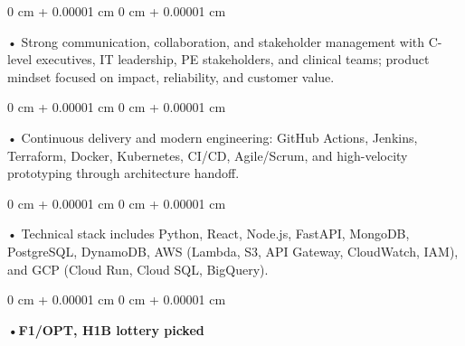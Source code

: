 \documentclass[10pt, letterpaper]{article}
\newenvironment{onecolentry}{
    \begin{adjustwidth}{
        0 cm + 0.00001 cm
    }{
        0 cm + 0.00001 cm
    }
}{
    \end{adjustwidth}
} %
\begin{document}
        \begin{onecolentry}
            • Strong communication, collaboration, and stakeholder management with C-level executives, IT leadership, PE stakeholders, and clinical teams; product mindset focused on impact, reliability, and customer value.
        \end{onecolentry}
        \begin{onecolentry}
            • Continuous delivery and modern engineering: GitHub Actions, Jenkins, Terraform, Docker, Kubernetes, CI/CD, Agile/Scrum, and high-velocity prototyping through architecture handoff.
        \end{onecolentry}
        \begin{onecolentry}
            • Technical stack includes Python, React, Node.js, FastAPI, MongoDB, PostgreSQL, DynamoDB, AWS (Lambda, S3, API Gateway, CloudWatch, IAM), and GCP (Cloud Run, Cloud SQL, BigQuery).
        \end{onecolentry}
        \begin{onecolentry}
                \textbf{•F1/OPT, H1B lottery picked}
        \end{onecolentry}

    \vspace{2 pt }
\end{document}
